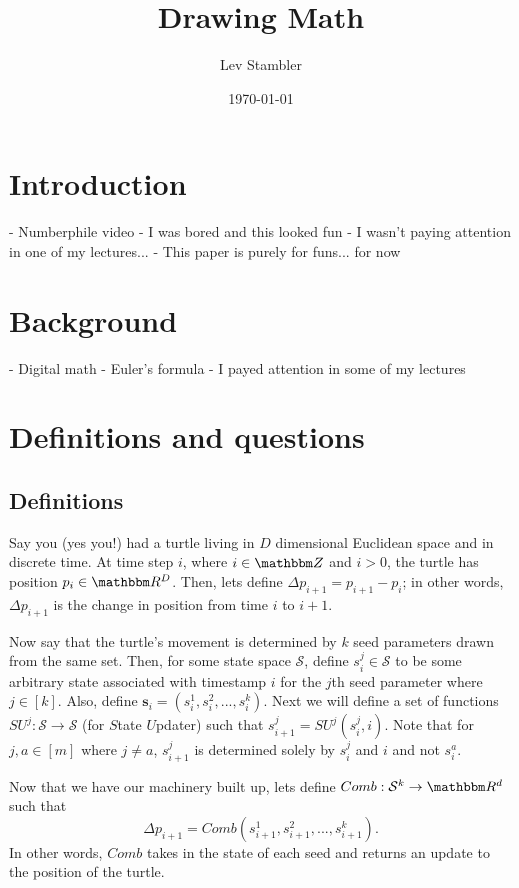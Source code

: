 \documentclass[11pt,titlepage]{article}
\newcommand{\myname}{Lev Stambler}
\begin{document}
\title{Drawing Math}

\author{\myname}

\date{\today}

\maketitle

\pagebreak
\section{Introduction}
- Numberphile video
- I was bored and this looked fun
- I wasn't paying attention in one of my lectures...
- This paper is purely for funs... for now

\section{Background}
- Digital math
- Euler's formula
- I payed attention in some of my lectures

\section{Definitions and questions}
\subsection{Definitions}
Say you (yes you!) had a turtle living in $D$ dimensional Euclidean
space and in discrete time. At time step $i$, where $i \in \Z$ and $i > 0$,
the turtle has position $p_i \in \R^D$.
Then, lets define $\Delta p_{i+1} = p_{i+1} - p_i$; in other words, $\Delta p_{i+1}$ is the change in position from time $i$ to $i + 1$.

Now say that the turtle's movement is determined by $k$ seed parameters drawn from
the same set. Then, for some state space $\mathcal{S}$,
define $s_i^j \in \mathcal{S}$ to be some arbitrary
state associated with timestamp $i$ for the $j$th seed parameter where $j \in [k]$.
Also, define $\pmb{s}_i = (s_i^1, s_i^2, ..., s_i^k)$.
Next we will define a set of functions $SU^j: \mathcal{S} \rightarrow \mathcal{S}$
(for $S$tate $U$pdater) such that $s_{i + 1}^j = SU^j(s_i^j, i)$. Note that for
$j, a \in [m]$ where $j \neq a$, $s_{i+1}^j$ is determined solely by $s_i^j$ and $i$ and not
$s_i^a$.

Now that we have our machinery built up, lets define $Comb: \mathcal{S}^k \rightarrow \R^d$ such that
$$
  \Delta p_{i + 1} = Comb\left(s^1_{i + 1}, s^2_{i + 1}, ..., s^k_{i + 1}\right).
$$
In other words, $Comb$ takes in the state of each seed and
returns an update to the position of the turtle.
\end{document}
